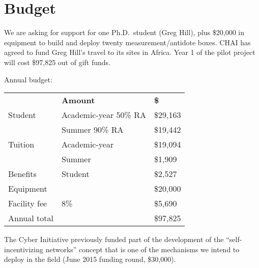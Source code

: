 \documentclass[11pt]{article}
\newcommand{\slim}{\vspace{\baselineskip}}
\begin{document}
\section{Budget}

We are asking for support for one Ph.D.~student (Greg Hill), plus
\$20,000 in equipment to build and deploy twenty measurement/antidote
boxes. CHAI has agreed to fund Greg Hill's travel to its sites in
Africa. Year 1 of the pilot project will cost \$97,825 out of gift
funds.

\slim

\noindent Annual budget:

\slim

\noindent \begin{tabular}{ll|l}
& \bf Amount & \bf \$ \\
Student & Academic-year 50\% RA & \$29,163 \\
        & Summer 90\% RA & \$19,442 \\

Tuition & Academic-year & \$19,094 \\
        & Summer        & \$1,909 \\

Benefits & Student & \$2,527 \\

Equipment &         & \$20,000 \\

\hline

Facility fee & 8\% & \$5,690 \\
Annual total & & \$97,825 \\

\end{tabular}

\slim

The Cyber Initiative previously funded part of the development of the
``self-incentivizing networks'' concept that is one of the mechanisms
we intend to deploy in the field (June 2015 funding round, \$30,000).

{\footnotesize



}
\end{document}
